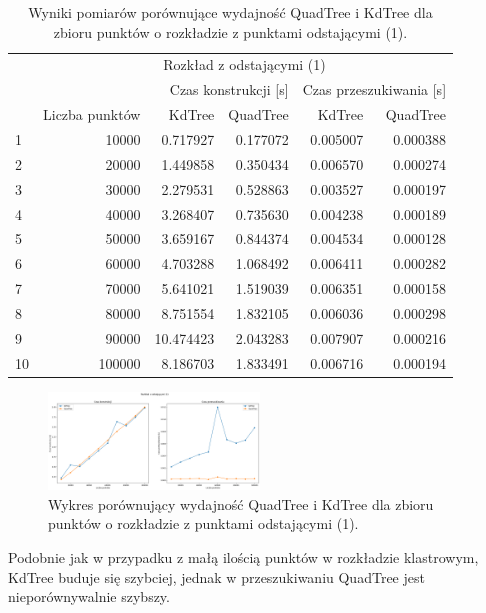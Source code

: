 \documentclass{lab}
\begin{document}
\begin{table}[H]
\centering
\begin{tabular}{lrrrrr}
  \toprule
   & \multicolumn{5}{c}{Rozkład z odstającymi (1)} \\
   &  & \multicolumn{2}{r}{Czas konstrukcji [s]} & \multicolumn{2}{r}{Czas przeszukiwania [s]} \\
   & Liczba punktów & KdTree & QuadTree & KdTree & QuadTree \\
  \midrule
  1 & 10000 & 0.717927 & 0.177072 & 0.005007 & 0.000388 \\
  2 & 20000 & 1.449858 & 0.350434 & 0.006570 & 0.000274 \\
  3 & 30000 & 2.279531 & 0.528863 & 0.003527 & 0.000197 \\
  4 & 40000 & 3.268407 & 0.735630 & 0.004238 & 0.000189 \\
  5 & 50000 & 3.659167 & 0.844374 & 0.004534 & 0.000128 \\
  6 & 60000 & 4.703288 & 1.068492 & 0.006411 & 0.000282 \\
  7 & 70000 & 5.641021 & 1.519039 & 0.006351 & 0.000158 \\
  8 & 80000 & 8.751554 & 1.832105 & 0.006036 & 0.000298 \\
  9 & 90000 & 10.474423 & 2.043283 & 0.007907 & 0.000216 \\
  10 & 100000 & 8.186703 & 1.833491 & 0.006716 & 0.000194 \\
  \bottomrule
  \end{tabular}
\caption{Wyniki pomiarów porównujące wydajność QuadTree i KdTree dla zbioru punktów o rozkładzie z punktami odstającymi (1).}
\label{tab:outlier_time_1}
\end{table}

\begin{figure}[H]
  \centering
  \includegraphics[width=0.5\textwidth]{resources/outlier_graph_1.png}
  \caption{Wykres porównujący wydajność QuadTree i KdTree dla zbioru punktów o rozkładzie z punktami odstającymi (1).}
  \label{fig:outlier_graph_1}
\end{figure}

Podobnie jak w przypadku z małą ilością punktów w rozkładzie klastrowym, KdTree buduje się szybciej, jednak w przeszukiwaniu QuadTree jest nieporównywalnie szybszy.
\end{document}
